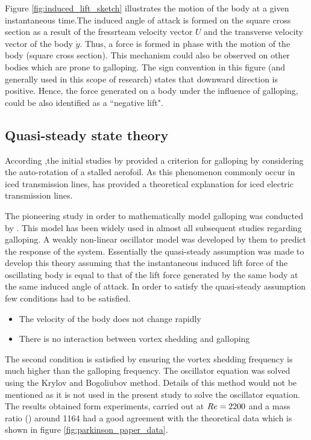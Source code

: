 

 Figure \ref{fig:induced_lift_sketch}  illustrates the motion of the body at a given instantaneous time.The induced angle of attack is formed on the square cross section as a result of the fressrteam velocity vector $U$ and the transverse velocity vector of the body $\dot{y}$. Thus, a force is formed in phase with the motion of the body (square cross section). This mechanism could also be observed on other bodies which are prone to galloping. The sign convention in this figure (and generally used in this scope of research) states that downward direction is positive. Hence, the force generated on a body under the influence of galloping, could be also identified as a ``negative lift".
 

\subsection{Quasi-steady state theory}
\label{sec:QSS theory}


According \cite{Paidoussis2010},the initial studies by \cite{Glauert1919} provided a criterion for galloping by considering the auto-rotation of a stalled aerofoil. As this phenomenon commonly occur in iced transmission lines, \cite{DenHartog1956} has provided a theoretical explanation for iced electric transmission lines. 

The pioneering study in order to mathematically model galloping was conducted by \cite{Parkinson1964}. This model has been widely used in almost all subsequent studies regarding galloping. A weakly non-linear oscillator model was developed by them to predict the response of the system. Essentially the quasi-steady assumption was made to develop this theory assuming that the instantaneous induced lift force of the oscillating body is equal to that of the lift force generated by the same body at the same induced angle of attack. In order to satisfy the quasi-steady assumption few conditions had to be satisfied.

\begin{itemize}
 \item The velocity of the body does not change rapidly
 \item There is no interaction between vortex shedding and galloping
\end{itemize}

The second condition is satisfied by ensuring the vortex shedding frequency is much higher than the galloping frequency.
The oscillator equation was solved using the Krylov and Bogoliubov method. Details of this method would not be mentioned as it is not used in the present study to solve the oscillator equation. The results obtained form experiments, carried out at $Re=2200$ and a mass ratio (\mstar) around 1164 had a good agreement with the theoretical data which is shown in figure \ref{fig:parkinson_paper_data}.

